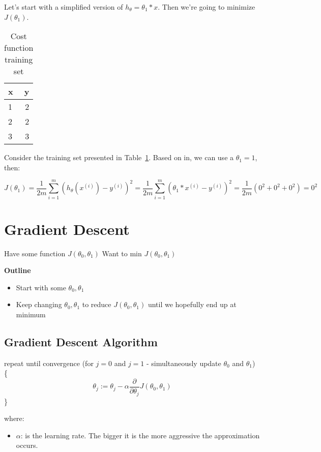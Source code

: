\documentclass[a4paper]{article}
\begin{document}
Let's start with a simplified version of $h_\theta = \theta_1 * x$. Then we're going to minimize $J(\theta_1)$.

\begin{table}[]
\centering
\begin{tabular}{l|r}
\textbf{x} & \textbf{y} \\\hline
1     & 2 \\
2     & 2 \\
3     & 3
\end{tabular}
\caption{Cost function training set}
\label{tab:cost-function-training-set}
\end{table}

Consider the training set presented in Table~\ref{tab:cost-function-training-set}. Based on in, we can use a $\theta_1 = 1$, then:

$$
J(\theta_1) = \frac{1}{2m}\sum_{i=1}^{m}(h_\theta(x^{(i)}) - y^{(i)})^2
= \frac{1}{2m}\sum_{i=1}^{m}(\theta_1 * x^{(i)} - y^{(i)})^2 = \frac{1}{2m}(0^2 + 0^2 + 0^2) = 0^2$$

\section{Gradient Descent}

Have some function $J(\theta_0,\theta_1)$
Want to min $J(\theta_0,\theta_1)$

\textbf{Outline}
\begin{itemize}
\item Start with some $\theta_0, \theta_1$
\item Keep changing $\theta_0, \theta_1$ to reduce $J(\theta_0,\theta_1)$ until we hopefully end up at minimum
\end{itemize}

\subsection{Gradient Descent Algorithm}

repeat until convergence (for $j=0$ and $j=1$ - simultaneously update $\theta_0$ and $\theta_1$) \{
$$
\theta_j := \theta_j - \alpha \frac{\partial}{\partial \theta_j}J(\theta_0, \theta_1)
$$
\}

\medskip

where:

\begin{itemize}
\item $\alpha$: is the learning rate. The bigger it is the more aggressive the approximation occurs.
\end{itemize}
\end{document}
